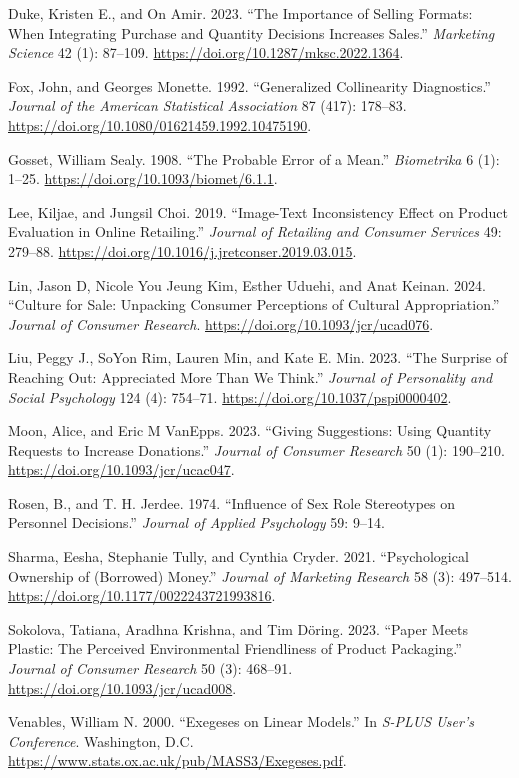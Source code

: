 \documentclass[
  11pt,
  letterpaper,
]{scrbook}
\newlength{\cslhangindent}
\newenvironment{CSLReferences}[2] %
 {\begin{list}{}{%
  \setlength{\itemindent}{0pt}
  \setlength{\leftmargin}{0pt}
  \setlength{\parsep}{0pt}
  \ifodd #1
   \setlength{\leftmargin}{\cslhangindent}
   \setlength{\itemindent}{-1\cslhangindent}
  \fi
  \setlength{\itemsep}{#2\baselineskip}}}
 {\end{list}}
\theoremstyle{definition}
\theoremstyle{definition}
\theoremstyle{plain}
\theoremstyle{plain}
\theoremstyle{remark}
\begin{document}
\begin{CSLReferences}{1}{0}
Duke, Kristen E., and On Amir. 2023. {``The Importance of Selling
Formats: When Integrating Purchase and Quantity Decisions Increases
Sales.''} \emph{Marketing Science} 42 (1): 87--109.
\url{https://doi.org/10.1287/mksc.2022.1364}.

Fox, John, and Georges Monette. 1992. {``Generalized Collinearity
Diagnostics.''} \emph{Journal of the American Statistical Association}
87 (417): 178--83. \url{https://doi.org/10.1080/01621459.1992.10475190}.

Gosset, William Sealy. 1908. {``The Probable Error of a Mean.''}
\emph{Biometrika} 6 (1): 1--25.
\url{https://doi.org/10.1093/biomet/6.1.1}.

Lee, Kiljae, and Jungsil Choi. 2019. {``Image-Text Inconsistency Effect
on Product Evaluation in Online Retailing.''} \emph{Journal of Retailing
and Consumer Services} 49: 279--88.
\url{https://doi.org/10.1016/j.jretconser.2019.03.015}.

Lin, Jason D, Nicole You Jeung Kim, Esther Uduehi, and Anat Keinan.
2024. {``Culture for Sale: Unpacking Consumer Perceptions of Cultural
Appropriation.''} \emph{Journal of Consumer Research}.
\url{https://doi.org/10.1093/jcr/ucad076}.

Liu, Peggy J., SoYon Rim, Lauren Min, and Kate E. Min. 2023. {``The
Surprise of Reaching Out: Appreciated More Than We Think.''}
\emph{Journal of Personality and Social Psychology} 124 (4): 754--71.
\url{https://doi.org/10.1037/pspi0000402}.

Moon, Alice, and Eric M VanEpps. 2023. {``Giving Suggestions: Using
Quantity Requests to Increase Donations.''} \emph{Journal of Consumer
Research} 50 (1): 190--210. \url{https://doi.org/10.1093/jcr/ucac047}.

Rosen, B., and T. H. Jerdee. 1974. {``Influence of Sex Role Stereotypes
on Personnel Decisions.''} \emph{Journal of Applied Psychology} 59:
9--14.

Sharma, Eesha, Stephanie Tully, and Cynthia Cryder. 2021.
{``Psychological Ownership of (Borrowed) Money.''} \emph{Journal of
Marketing Research} 58 (3): 497--514.
\url{https://doi.org/10.1177/0022243721993816}.

Sokolova, Tatiana, Aradhna Krishna, and Tim Döring. 2023. {``Paper Meets
Plastic: The Perceived Environmental Friendliness of Product
Packaging.''} \emph{Journal of Consumer Research} 50 (3): 468--91.
\url{https://doi.org/10.1093/jcr/ucad008}.

Venables, William N. 2000. {``Exegeses on Linear Models.''} In
\emph{S-PLUS User's Conference}. Washington, D.C.
\url{https://www.stats.ox.ac.uk/pub/MASS3/Exegeses.pdf}.

\end{CSLReferences}


\backmatter
\end{document}
